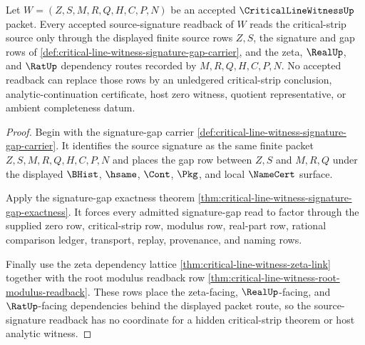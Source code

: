 \begin{theorem}
\label{thm:critical-line-witness-source-signature-readback}
Let $W=(Z,S,M,R,Q,H,C,P,N)$ be an accepted $\CriticalLineWitnessUp$ packet. Every accepted source-signature readback of $W$ reads the critical-strip source only through the displayed finite source rows $Z,S$, the signature and gap rows of \autoref{def:critical-line-witness-signature-gap-carrier}, and the zeta, $\RealUp$, and $\RatUp$ dependency routes recorded by $M,R,Q,H,C,P,N$. No accepted readback can replace those rows by an unledgered critical-strip conclusion, analytic-continuation certificate, host zero witness, quotient representative, or ambient completeness datum.
\end{theorem}
\begin{proof}
Begin with the signature-gap carrier \autoref{def:critical-line-witness-signature-gap-carrier}. It identifies the source signature as the same finite packet $Z,S,M,R,Q,H,C,P,N$ and places the gap row between $Z,S$ and $M,R,Q$ under the displayed $\BHist$, $\hsame$, $\Cont$, $\Pkg$, and local $\NameCert$ surface.

Apply the signature-gap exactness theorem \autoref{thm:critical-line-witness-signature-gap-exactness}. It forces every admitted signature-gap read to factor through the supplied zero row, critical-strip row, modulus row, real-part row, rational comparison ledger, transport, replay, provenance, and naming rows.

Finally use the zeta dependency lattice \autoref{thm:critical-line-witness-zeta-link} together with the root modulus readback row \autoref{thm:critical-line-witness-root-modulus-readback}. These rows place the zeta-facing, $\RealUp$-facing, and $\RatUp$-facing dependencies behind the displayed packet route, so the source-signature readback has no coordinate for a hidden critical-strip theorem or host analytic witness.
\end{proof}

